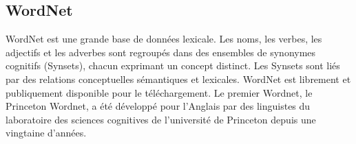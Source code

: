 
    \subsection{WordNet}
    WordNet est une grande base de données lexicale. Les noms, les verbes, les adjectifs et les adverbes sont regroupés dans des ensembles de synonymes cognitifs (Synsets), chacun exprimant un concept distinct. Les Synsets sont liés par des relations conceptuelles sémantiques et lexicales. WordNet est librement et publiquement disponible pour le téléchargement. Le premier Wordnet, le Princeton Wordnet, a été développé pour l'Anglais par des linguistes du laboratoire des sciences cognitives de l'université de Princeton depuis une vingtaine d'années.
